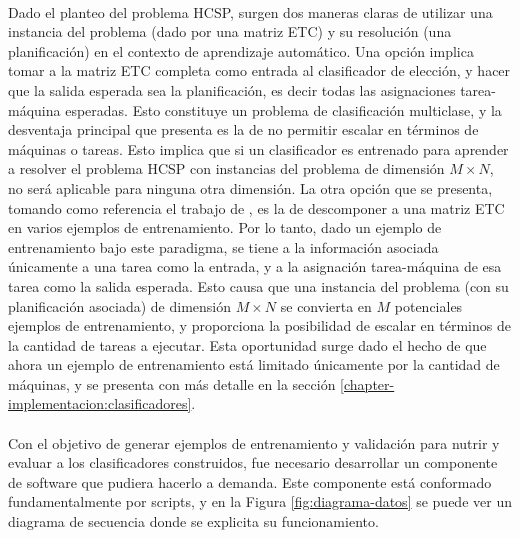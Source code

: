 \paragraph{} Dado el planteo del problema HCSP, surgen dos maneras claras de utilizar una instancia del problema (dado por una matriz ETC) y su resolución (una planificación) en el contexto de aprendizaje automático. Una opción implica tomar a la matriz ETC completa como entrada al clasificador de elección, y hacer que la salida esperada sea la planificación, es decir todas las asignaciones tarea-máquina esperadas. Esto constituye un problema de clasificación multiclase, y la desventaja principal que presenta es la de no permitir escalar en términos de máquinas o tareas. Esto implica que si un clasificador es entrenado para aprender a resolver el problema HCSP con instancias del problema de dimensión $M \times N$, no será aplicable para ninguna otra dimensión. La otra opción que se presenta, tomando como referencia el trabajo de \citet{savant-original}, es la de descomponer a una matriz ETC en varios ejemplos de entrenamiento. Por lo tanto, dado un ejemplo de entrenamiento bajo este paradigma, se tiene a la información asociada únicamente a una tarea como la entrada, y a la asignación tarea-máquina de esa tarea como la salida esperada. Esto causa que una instancia del problema (con su planificación asociada) de dimensión $M \times N$ se convierta en $M$ potenciales ejemplos de entrenamiento, y proporciona la posibilidad de escalar en términos de la cantidad de tareas a ejecutar. Esta oportunidad surge dado el hecho de que ahora un ejemplo de entrenamiento está limitado únicamente por la cantidad de máquinas, y se presenta con más detalle en la sección \ref{chapter-implementacion:clasificadores}.


\paragraph{} Con el objetivo de generar ejemplos de entrenamiento y validación para nutrir y evaluar a los clasificadores construidos, fue necesario desarrollar un componente de software que pudiera hacerlo a demanda. Este componente está conformado fundamentalmente por scripts, y en la Figura \ref{fig:diagrama-datos} se puede ver un diagrama de secuencia donde se explicita su funcionamiento. 

